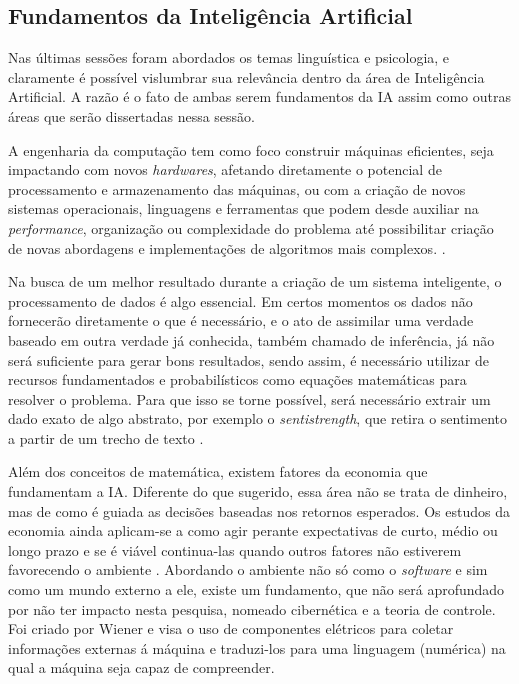 \subsection{Fundamentos da Inteligência Artificial}
Nas últimas sessões foram abordados os temas linguística e psicologia, e claramente é possível vislumbrar sua relevância dentro da área de Inteligência Artificial. A razão é o fato de ambas serem fundamentos da IA assim como outras áreas que serão dissertadas nessa sessão.

A engenharia da computação tem como foco construir máquinas eficientes, seja impactando com novos \textit{hardwares}, afetando diretamente o potencial de processamento e armazenamento das máquinas, ou com a criação de novos sistemas operacionais, linguagens e ferramentas que podem desde auxiliar na \textit{performance}, organização ou complexidade do problema até possibilitar criação de novas abordagens e implementações de algoritmos mais complexos. \cite[13-14]{russell2003artificial}.

Na busca de um melhor resultado durante a criação de um sistema inteligente, o processamento de dados é algo essencial. Em certos momentos os dados não fornecerão diretamente o que é necessário, e o ato de assimilar uma verdade baseado em outra verdade já conhecida, também chamado de inferência, já não será suficiente para gerar bons resultados, sendo assim, é necessário utilizar de recursos fundamentados e probabilísticos como equações matemáticas para resolver o problema. Para que isso se torne possível, será necessário extrair um dado exato de algo abstrato, por exemplo o \textit{sentistrength}, que retira o sentimento a partir de um trecho de texto \cite{boole1854investigation}.

Além dos conceitos de matemática, existem fatores da economia que fundamentam a IA. Diferente do que sugerido, essa área não se trata de dinheiro, mas de como é guiada as decisões baseadas nos retornos esperados. Os estudos da economia ainda aplicam-se a como agir perante expectativas de curto, médio ou longo prazo e se é viável continua-las quando outros fatores não estiverem favorecendo o ambiente \cite[9]{russell2003artificial}. Abordando o ambiente não só como o \textit{software} e sim como um mundo externo a ele, existe um fundamento, que não será aprofundado por não ter impacto nesta pesquisa, nomeado cibernética e a teoria de controle. Foi criado por Wiener\cite{wiener1961cybernetics} e visa o uso de componentes elétricos para coletar informações externas á máquina e traduzi-los para uma linguagem (numérica) na qual a máquina seja capaz de compreender.

